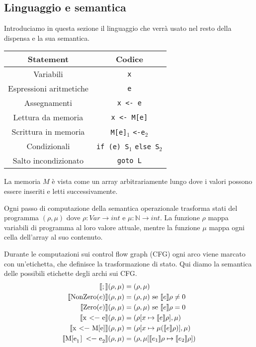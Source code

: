 \documentclass[a4paper, 11pt]{article}
\newcommand{\code}[1]{\textup{\lstinline{#1}}}
\newcommand{\sem}[1]{\llbracket #1 \rrbracket (\rho, \mu)}
\begin{document}
	\subsection{Linguaggio e semantica}
	Introduciamo in questa sezione il linguaggio che verrà usato nel resto della dispensa e la sua semantica.
	\begin{center}
			\begin{tabular}{cc}
			\hline
			\textbf{Statement} & \textbf{Codice} \\
			\hline
			\hline
			Variabili & \lstinline|x| \\
			Espressioni aritmetiche & \lstinline|e| \\
			Assegnamenti & \lstinline|x <- e| \\
			Lettura da memoria & \lstinline|x <- M[e]| \\
			Scrittura in memoria & \lstinline|M[e]|$_1$ \lstinline|<-e|$_2$ \\
			Condizionali & \lstinline|if (e) S|$_1$ \lstinline|else S|$_2$ \\
			Salto incondizionato & \lstinline|goto L|\\
			\hline
		\end{tabular}
	\end{center}

	La memoria $M$ è vista come un array arbitrariamente lungo dove i valori possono essere inseriti e letti successivamente.
	
	Ogni passo di computazione della semantica operazionale trasforma stati del programma $(\rho, \mu)$ dove $\rho: Var \to int$ e $\mu : \mathbb{N} \to int$. La funzione $\rho$ mappa variabili di programma al loro valore attuale, mentre la funzione $\mu$ mappa ogni cella dell'array al suo contenuto.
	
	Durante le computazioni sui control flow graph (CFG) ogni arco viene marcato con un'etichetta, che definisce la trasformazione di stato. Qui diamo la semantica delle possibili etichette degli archi sui CFG.
	\begin{align*}
		\sem{;} &= (\rho, \mu) \\
		\sem{\code{NonZero}(e)} &= (\rho, \mu) \text{ se } \llbracket e \rrbracket \rho \neq 0 \\
		\sem{\code{Zero}(e)} &= (\rho, \mu) \text{ se } \llbracket e \rrbracket \rho = 0 \\
		\sem{\code{x <- e}} &= (\rho \lbrack x \mapsto \llbracket e \rrbracket \rho \rbrack, \mu)  \\
		\sem{\code{x <- M[e]}} &= (\rho \lbrack x \mapsto \mu(\llbracket e \rrbracket \rho) \rbrack, \mu)  \\
		\sem{\code{M[e}_1\code{] <- e}_2} &= (\rho, \mu\lbrack \llbracket e_1 \rrbracket \rho \mapsto \llbracket e_2 \rrbracket \rho \rbrack)
	\end{align*}
	
\end{document}
